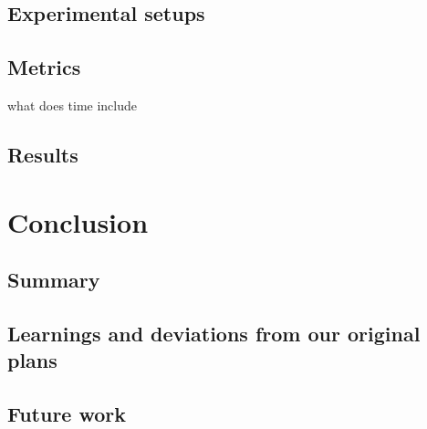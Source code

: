 \documentclass[a4paper,11pt,english]{article}
\begin{document}
\subsection{Experimental setups}
\subsection{Metrics}
what does time include
\subsection{Results}

\section{Conclusion}
\label{Conclusion}

\subsection{Summary}
\subsection{Learnings and deviations from our original plans}
\subsection{Future work}

\newpage


\end{document}
